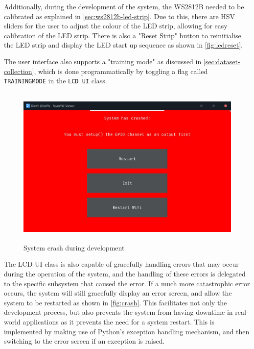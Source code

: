 
Additionally, during the development of the system, the WS2812B needed to be calibrated as explained in \autoref{sec:ws2812b-led-strip}. Due to this, there are HSV sliders for the user to adjust the colour of the LED strip, allowing for easy calibration of the LED strip. There is also a "Reset Strip" button to reinitialise the LED strip and display the LED start up sequence as shown in \autoref{fig:ledreset}.

The user interface also supports a "training mode" as discussed in \autoref{sec:dataset-collection}, which is done programmatically by toggling a flag called \texttt{TRAININGMODE} in the \texttt{LCD UI} class.
\begin{figure}[H]
    \hfill
    \begin{minipage}[t]{\textwidth}
      \centering
      \includegraphics[height=8cm]{imgs/python/systemcrash.jpg}
      \caption{System crash during development}
      \label{fig:crash}
    \end{minipage}
\end{figure}

The LCD UI class is also capable of gracefully handling errors that may occur during the operation of the system, and the handling of these errors is delegated to the specific subsystem that caused the error. If a much more catastrophic error occurs, the system will still gracefully display an error screen, and allow the system to be restarted as shown in \autoref{fig:crash}. This facilitates not only the development process, but also prevents the system from having downtime in real-world applications as it prevents the need for a system restart. This is implemented by making use of Python's exception handling mechanism, and then switching to the error screen if an exception is raised.

